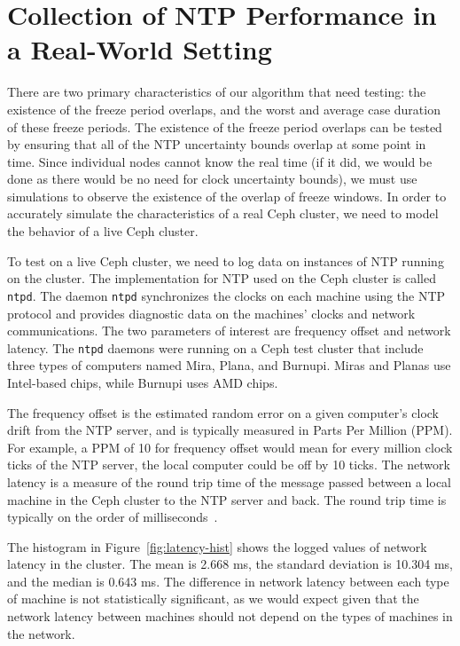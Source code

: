 \section{Collection of NTP Performance in a Real-World Setting}

There are two primary characteristics of our algorithm that need
testing: the existence of the freeze period overlaps, and the 
worst and average case duration of these freeze periods. 
The existence of the freeze period overlaps can be tested by 
ensuring that all of the NTP uncertainty bounds overlap at some 
point in time. Since individual nodes cannot know the real time
(if it did, we would be done as there would be no need for clock uncertainty
bounds), we must use simulations to observe the existence of 
the overlap of freeze windows. In order to accurately simulate the
characteristics of a real Ceph cluster, we need to model the
behavior of a live Ceph cluster.

To test on a live Ceph cluster, we need to log data on 
instances of NTP running on the cluster. The implementation for NTP 
used on the Ceph cluster is called \texttt{ntpd}. The daemon \texttt{ntpd} 
synchronizes the clocks on each machine using the NTP protocol and
provides diagnostic data on the machines' clocks and network 
communications. The two parameters of interest are frequency offset and
network latency. The \texttt{ntpd} daemons were running on a Ceph
test cluster that include three types of computers named Mira,
Plana, and Burnupi. Miras and Planas use Intel-based chips, while
Burnupi uses AMD chips.

The frequency offset is the estimated random error on a given computer's
clock drift from the NTP server, and is typically measured in Parts
Per Million (PPM). For example, a PPM of 10 for frequency offset would
mean for every million clock ticks of the NTP server, the local
computer could be off by 10 ticks. The network latency is a measure of
the round trip time of the message passed between a local machine in
the Ceph cluster to the NTP server and back. The round trip time
is typically on the order of milliseconds~\citep{Sage}.

The histogram in Figure~\ref{fig:latency-hist} shows the logged
values of network latency in the cluster. The mean is 2.668 ms, the 
standard deviation is 10.304 ms, and the median is 0.643 ms. The 
difference in network latency between each type of machine is not
statistically significant, as we would expect given that the network
latency between machines should not depend on the types of 
machines in the network. 

